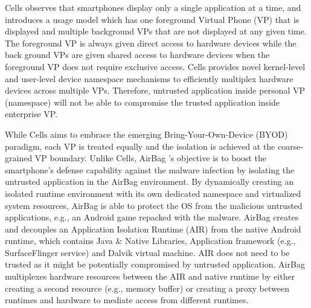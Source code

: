 Cells observes that smartphones display only a single application at a time, and
introduces a usage model which has one foreground Virtual Phone (VP) that is
displayed and multiple background VPs that are not displayed at any given time.
The foreground VP is always given direct access to hardware devices while the
back ground VPs are given shared access to hardware devices when the foreground
VP does not require exclusive access. Cells provides novel kernel-level and
user-level device namespace mechanisms to efficiently multiplex hardware devices
across multiple VPs. Therefore, untrusted application inside personal VP
(namespace) will not be able to compromise the trusted application inside
enterprise VP. 

While Cells aims to embrace the emerging Bring-Your-Own-Device (BYOD) paradigm,
each VP is treated equally and the isolation is achieved at the coarse-grained
VP boundary. Unlike Cells, AirBag \cite{AirBag}'s objective is to boost the
smartphone's defense capability against the malware infection by isolating the
untrusted application in the AirBag environment. By dynamically creating an
isolated runtime environment with its own dedicated namespace and virtualized
system resources, AirBag is able to protect the OS from the malicious untrusted
applications, e.g., an Android game repacked with the malware. AirBag creates
and decouples an Application Isolation Runtime (AIR) from the native Android
runtime, which contains Java \& Native Libraries, Application framework (e.g.,
SurfaceFlinger service) and Dalvik virtual machine.  AIR does not need to be
trusted as it might be potentially compromised by untrusted application. AirBag
multiplexes hardware resources between the AIR and native runtime by either
creating a second resource (e.g., memory buffer) or creating a proxy between
runtimes and hardware to mediate access from different runtimes.



